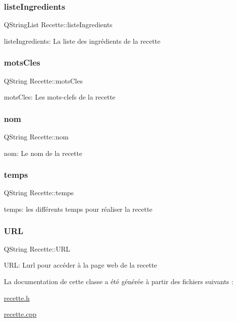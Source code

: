 \subsubsection{\texorpdfstring{liste\+Ingredients}{listeIngredients}}
{\footnotesize\ttfamily Q\+String\+List Recette\+::liste\+Ingredients\hspace{0.3cm}{\ttfamily [private]}}

liste\+Ingredients\+: La liste des ingrédients de la recette \mbox{\label{classRecette_ad17f7e5b745e0b01932acb6d6ff58dd6}} 
\subsubsection{\texorpdfstring{mots\+Cles}{motsCles}}
{\footnotesize\ttfamily Q\+String Recette\+::mots\+Cles\hspace{0.3cm}{\ttfamily [private]}}

mots\+Cles\+: Les mots-\/clefs de la recette \mbox{\label{classRecette_a8923b8c64bab1afaa4595442bc7b5803}} 
\subsubsection{\texorpdfstring{nom}{nom}}
{\footnotesize\ttfamily Q\+String Recette\+::nom\hspace{0.3cm}{\ttfamily [private]}}

nom\+: Le nom de la recette \mbox{\label{classRecette_a6165aaa32628fc48e4467f59c4cdcf99}} 
\subsubsection{\texorpdfstring{temps}{temps}}
{\footnotesize\ttfamily Q\+String Recette\+::temps\hspace{0.3cm}{\ttfamily [private]}}

temps\+: les différents temps pour réaliser la recette \mbox{\label{classRecette_a7e0fe7b2bce6f2936644636180455649}} 
\subsubsection{\texorpdfstring{U\+RL}{URL}}
{\footnotesize\ttfamily Q\+String Recette\+::\+U\+RL\hspace{0.3cm}{\ttfamily [private]}}

U\+RL\+: L\textquotesingle{}url pour accéder à la page web de la recette 

La documentation de cette classe a été générée à partir des fichiers suivants \+:\begin{DoxyCompactItemize}
\item 
\hyperlink{recette_8h}{recette.\+h}\item 
\hyperlink{recette_8cpp}{recette.\+cpp}\end{DoxyCompactItemize}
